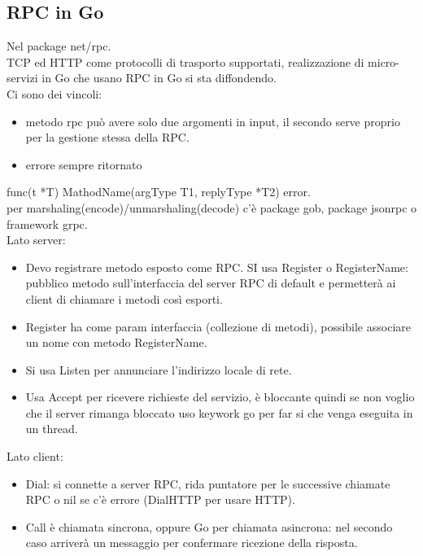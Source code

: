 \documentclass{article}
\begin{document}
\subsection{RPC in Go}
Nel package net/rpc.\\ TCP ed HTTP come protocolli di trasporto supportati, realizzazione di micro-servizi in Go che usano RPC in Go si sta diffondendo.\\ Ci sono dei vincoli:
\begin{itemize}
\item metodo rpc può avere solo due argomenti in input, il secondo serve proprio per la gestione stessa della RPC.
\item errore sempre ritornato
\end{itemize}
func(t *T) MathodName(argType T1, replyType *T2) error. \\ per marshaling(encode)/unmarshaling(decode) c'è package gob, package jsonrpc o framework grpc.\\ Lato server:
\begin{itemize}
\item Devo registrare metodo esposto come RPC. SI usa Register o RegisterName: pubblico metodo sull'interfaccia del server RPC di default e permetterà ai client di chiamare i metodi così esporti. 
\item Register ha come param interfaccia (collezione di metodi), possibile associare un nome con metodo RegisterName.
\item Si usa Listen per annunciare l'indirizzo locale di rete.
\item Usa Accept per ricevere richieste del servizio, è bloccante quindi se non voglio che il server rimanga bloccato uso keywork go per far si che venga eseguita in un thread. 
\end{itemize}
Lato client:
\begin{itemize}
\item Dial: si connette a server RPC, rida puntatore per le successive chiamate RPC o nil se c'è errore (DialHTTP per usare HTTP).
\item Call è  chiamata sincrona, oppure Go per chiamata asincrona: nel secondo caso arriverà un messaggio per confermare ricezione della risposta.
\end{itemize}
\end{document}
